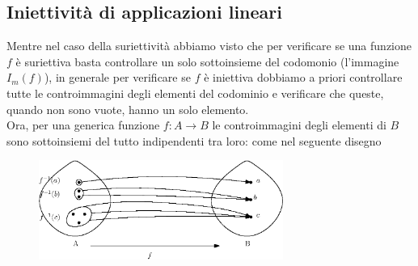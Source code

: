 \documentclass{book}
\begin{document}
\subsection{Iniettività di applicazioni lineari}
Mentre nel caso della suriettività abbiamo visto che per verificare se una funzione $f$ è suriettiva basta
controllare un solo sottoinsieme del codomonio (l'immagine $I_m(f)$), in generale per verificare se $f$ è
iniettiva dobbiamo a priori controllare tutte le controimmagini degli elementi del codominio e verificare che
queste, quando non sono vuote, hanno un solo elemento.\\
Ora, per una generica funzione $f:A\to B$ le controimmagini degli elementi di $B$ sono sottoinsiemi del tutto
indipendenti tra loro: come nel seguente disegno
\begin{figure}[th]
  \centering
  \includegraphics[width=8cm]{img/finiti/imgex4-4-4.eps}
\end{figure}
\end{document}
